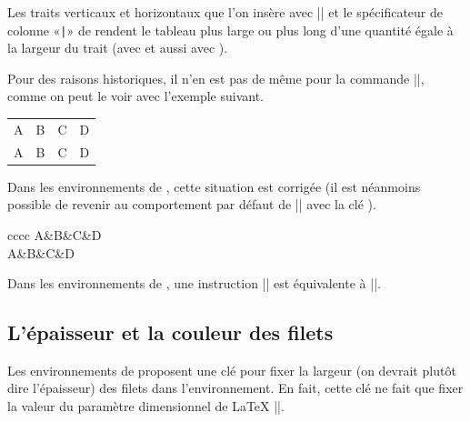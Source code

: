 \documentclass[dvipsnames]{article}
\begin{document}
\label{cline}

Les traits verticaux et horizontaux que l'on insère avec |\hline| et le
spécificateur de colonne «\verb+|+» de  rendent le tableau plus large
ou plus long d'une quantité égale à la largeur du trait (avec  et
aussi avec ).

\smallskip
Pour des raisons historiques, il n'en est pas de même pour la commande |\cline|,
comme on peut le voir avec l'exemple suivant.

\medskip
\begin{Code}[width=10cm,show-output]
\setlength{\arrayrulewidth}{2pt}
\begin{tabular}{cccc} \hline
A&B&C&D \\ \emph{\cline{2-2}}
A&B&C&D \\ \hline
\end{tabular}
\end{Code}

\medskip
{}
Dans les environnements de , cette situation est corrigée (il
est néanmoins possible de revenir au comportement par défaut de |\cline| avec la
clé ).

\medskip
\begin{Code}[width=10cm,show-output,no-cell-nodes]
\setlength{\arrayrulewidth}{2pt}
\begin{NiceTabular}{cccc} \hline
A&B&C&D \\ \emph{}
A&B&C&D \\ \hline
\end{NiceTabular}
\end{Code}

\medskip
Dans les environnements de , une instruction
|| est équivalente à
||.

\subsection{L'épaisseur et la couleur des filets}


Les environnements de  proposent une clé
 pour fixer la largeur (on devrait plutôt dire
l'épaisseur) des filets dans l'environnement. En fait, cette clé ne fait que
fixer la valeur du paramètre dimensionnel de LaTeX |\arrayrulewidth|.
\end{document}
